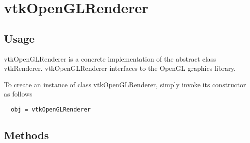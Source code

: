 \section{vtkOpenGLRenderer}

\subsection{Usage}

 vtkOpenGLRenderer is a concrete implementation of the abstract class
 vtkRenderer. vtkOpenGLRenderer interfaces to the OpenGL graphics library.

To create an instance of class vtkOpenGLRenderer, simply
invoke its constructor as follows
\begin{verbatim}
  obj = vtkOpenGLRenderer
\end{verbatim}
\subsection{Methods}


